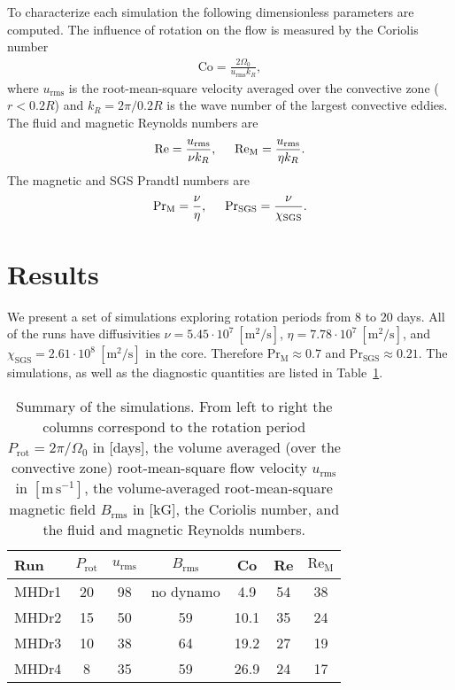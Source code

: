 \documentclass[baaa]{baaa}
\begin{document}
To characterize each simulation the following dimensionless parameters are computed. The influence of rotation on the flow is measured by the Coriolis number
\begin{align}
    \mathrm{Co} = \frac{2 \Omega_0}{u_\mathrm{rms} k_R},
\end{align}
where $u_\mathrm{rms}$ is the root-mean-square velocity averaged over the convective zone ($r < 0.2 R$) and $k_R = 2\pi/0.2R$ is the wave number of the largest convective eddies. The fluid and magnetic Reynolds numbers are
\begin{align}
    \mathrm{Re} = \frac{u_\mathrm{rms}}{\nu k_R}, \hspace*{0.5cm}  \mathrm{Re_M} = \frac{u_\mathrm{rms}}{\eta k_R}.
\end{align}
The magnetic and SGS Prandtl numbers are
\begin{align*}
    \mathrm{Pr}_\mathrm{M} = \frac{\nu}{\eta}, \hspace*{0.5cm} \mathrm{Pr}_\mathrm{SGS} = \frac{\nu}{\chi_\mathrm{SGS}}.
\end{align*}



\section{Results \label{results}}
We present a set of simulations exploring rotation periods from 8 to 20 days. All of the runs have diffusivities $\nu = 5.45\cdot 10^7~\mathrm{[m^2/s]}$, $\eta = 7.78\cdot 10^7~\mathrm{[m^2/s]}$, and $\chi_\mathrm{SGS} = 2.61\cdot 10^8~\mathrm{[m^2/s]}$ in the core. Therefore $\mathrm{Pr}_\mathrm{M} \approx 0.7$ and $\mathrm{Pr}_\mathrm{SGS} \approx 0.21$. The simulations, as well as the diagnostic quantities are listed in Table~\ref{table-1}.


\begin{table}[t!]
\centering
\caption{Summary of the simulations. From left to right the columns correspond to the rotation period $P_\mathrm{rot}=2\pi/\Omega_0$ in [days], the volume averaged (over the convective zone) root-mean-square flow velocity $u_\mathrm{rms}$ in $[\mathrm{m\,s^{-1}}]$, the volume-averaged root-mean-square magnetic field $B_\mathrm{rms}$ in [kG], the Coriolis number, and the fluid and magnetic Reynolds numbers.}
\begin{tabular}{lcccccc}
\hline\hline\noalign{\smallskip}
Run & $P_\mathrm{rot}$ & $u_\mathrm{rms}$ & $B_\mathrm{rms}$ & Co & Re & $\mathrm{Re}_\mathrm{M} $ \\
\hline\noalign{\smallskip}
MHDr1 & 20 & 98 & no dynamo & 4.9 & 54 & 38 \\
MHDr2 & 15 & 50 & 59 & 10.1 & 35 &  24 \\
MHDr3 & 10 & 38 & 64 & 19.2 & 27 & 19 \\
MHDr4 & 8 & 35 & 59 & 26.9 & 24 & 17 \\
\hline
\end{tabular}
\label{table-1}
\end{table}
\end{document}
